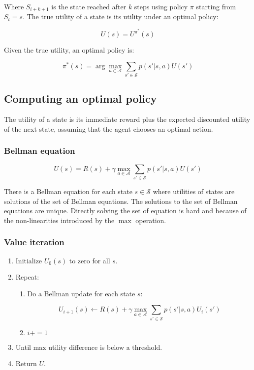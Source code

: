 			Where $S_{i+k+1}$ is the state reached after $k$ steps using policy $\pi$ starting from $S_t = s$.
			The true utility of a state is its utility under an optimal policy:

			$$U(s) = U^{\pi^*}(s)$$

			Given the true utility, an optimal policy is:

			$$\pi^*(s) = \arg\max\limits_{a\in\mathcal{A}}\sum\limits_{s'\in\mathcal{S}}p(s'|s,a)U(s')$$


	\subsection{Computing an optimal policy}
	The utility of a state is its immediate reward plus the expected discounted utility of the next state, assuming that the agent chooses an optimal action.

		\subsubsection{Bellman equation}	

		$$U(s) = R(s) + \gamma\max\limits_{a\in\mathcal{A}}\sum\limits_{s'\in\mathcal{S}}p(s'|s,a)U(s')$$

		There is a Bellman equation for each state $s\in\mathcal{S}$ where utilities of states are solutions of the set of Bellman equations.
		The solutions to the set of Bellman equations are unique.
		Directly solving the set of equation is hard and because of the non-linearities introduced by the $\max$ operation.

		\subsubsection{Value iteration}

		\begin{enumerate}
			\item Initialize $U_0(s)$ to zero for all $s$.
			\item Repeat:

				\begin{enumerate}
					\item Do a Bellman update for each state $s$:

						$$U_{i+1}(s) \leftarrow R(s) + \gamma\max\limits_{a\in\mathcal{A}}\sum\limits_{s'\in\mathcal{S}}p(s'|s,a)U_i(s')$$

					\item $i += 1$
				\end{enumerate}

			\item Until max utility difference is below a threshold.
			\item Return $U$.
		\end{enumerate}


